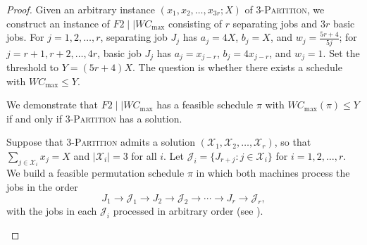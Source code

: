 \documentclass[12pt]{article}
\begin{document}
\begin{sloppypar}
\begin{proof}
            Given an arbitrary instance $(x_1, x_2, \ldots, x_{3r}; X)$ of 3-\textsc{Partition}, we construct an instance of $F2 \mid \mid W C_{\max}$ consisting of $r$ separating jobs and $3r$ basic jobs. For $j=1, 2, \ldots, r$, separating job $J_j$ has $a_j=4X$, $b_j=X$, and $w_j=\frac{5r+4}{5j}$; for $j=r+1, r+2, \ldots, 4r$, basic job $J_j$ has $a_j=x_{j-r}$, $b_j=4 x_{j-r}$, and $w_j=1$. Set the threshold to $Y=(5r+4)X$. The question is whether there exists a schedule with $W C_{\max} \leq Y$.
            
            We demonstrate that $F2 \mid \mid W C_{\max}$ has a feasible schedule $\pi$ with $W C_{\max}(\pi) \leq Y$ if and only if 3-\textsc{Partition} has a solution.
            
            Suppose that 3-\textsc{Partition} admits a solution $(\mathcal{X}_1, \mathcal{X}_2, \ldots, \mathcal{X}_r)$, so that $\sum_{j \in \mathcal{X}_i} x_j=X$ and $|\mathcal{X}_i|=3$ for all $i$. Let $\mathcal{J}_i=\{J_{r+j}: j \in \mathcal{X}_i\}$ for $i=1, 2, \ldots, r$. We build a feasible permutation schedule $\pi$ in which both machines process the jobs in the order 
            \begin{equation*}
                J_1 \to \mathcal{J}_1 \to J_2 \to \mathcal{J}_2 \to \cdots \to J_r \to \mathcal{J}_r,
            \end{equation*} 
            with the jobs in each $\mathcal{J}_i$ processed in arbitrary order (see ). 
            
            \begin{figure}[H]
                \centering
\end{figure}
\end{proof}
\end{sloppypar}
\end{document}
